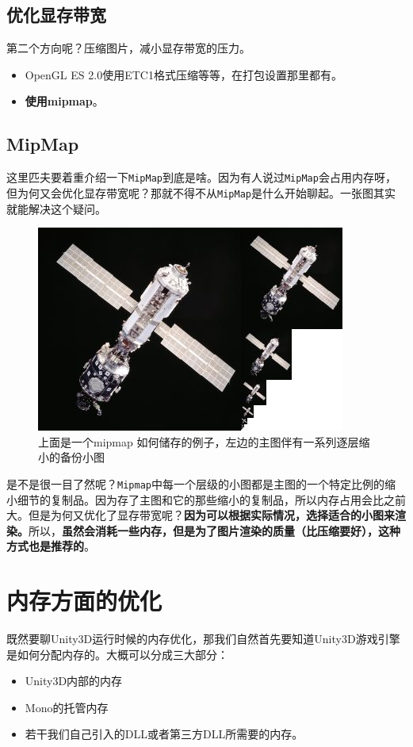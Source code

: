 \documentclass[UTF8,a4paper,12pt]{ctexart}
\begin{document}
  		\subsection{优化显存带宽}
  			第二个方向呢？压缩图片，减小显存带宽的压力。
  				\begin{itemize}
  					\item OpenGL ES 2.0使用ETC1格式压缩等等，在打包设置那里都有。
  					\item \textbf{使用mipmap}。
  				\end{itemize}
  			
  		\subsection{MipMap}
  			这里匹夫要着重介绍一下\verb|MipMap|到底是啥。因为有人说过\verb|MipMap|会占用内存呀，但为何又会优化显存带宽呢？那就不得不从\verb|MipMap|是什么开始聊起。一张图其实就能解决这个疑问。
  				\begin{figure}[H]
  					\centering
  					\includegraphics[scale=0.8]{mipMap.jpg}
  					\caption{上面是一个mipmap 如何储存的例子，左边的主图伴有一系列逐层缩小的备份小图}
  				\end{figure}
  			
  			是不是很一目了然呢？\verb|Mipmap|中每一个层级的小图都是主图的一个特定比例的缩小细节的复制品。因为存了主图和它的那些缩小的复制品，所以内存占用会比之前大。但是为何又优化了显存带宽呢？\textbf{因为可以根据实际情况，选择适合的小图来渲染。}所以，\textbf{虽然会消耗一些内存，但是为了图片渲染的质量（比压缩要好），这种方式也是推荐的}。
  			
  \section{内存方面的优化}
  		既然要聊Unity3D运行时候的内存优化，那我们自然首先要知道Unity3D游戏引擎是如何分配内存的。大概可以分成三大部分：
  			\begin{itemize}
  				\item Unity3D内部的内存
  				\item Mono的托管内存
  				\item 若干我们自己引入的DLL或者第三方DLL所需要的内存。
  			\end{itemize}
  		
\end{document}
